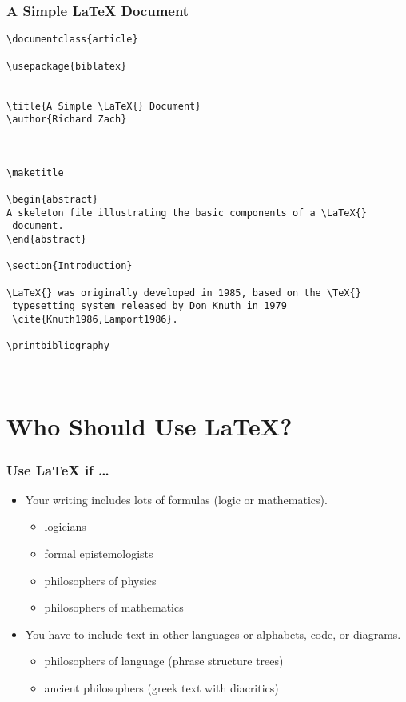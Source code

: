 \begin{frame}[fragile]
\frametitle{A Simple \LaTeX{} Document}

\begin{verbatim}
\documentclass{article}

\usepackage{biblatex}


\title{A Simple \LaTeX{} Document}
\author{Richard Zach}



\maketitle

\begin{abstract}
A skeleton file illustrating the basic components of a \LaTeX{}
 document.
\end{abstract}

\section{Introduction}

\LaTeX{} was originally developed in 1985, based on the \TeX{}
 typesetting system released by Don Knuth in 1979
 \cite{Knuth1986,Lamport1986}.

\printbibliography



\end{verbatim}
\end{frame}


\section*{Who Should Use \LaTeX{}?}

\begin{frame}
\frametitle{Use \LaTeX{} if \dots }

\begin{itemize}
\item Your writing includes lots of formulas (logic or mathematics). 
  \begin{itemize}
  \item logicians 
  \item formal epistemologists
  \item philosophers of physics
  \item philosophers of mathematics
  \end{itemize}

\item You have to include text in other languages or alphabets, code,
or diagrams.
\begin{itemize}
\item philosophers of language (phrase structure trees)
\item ancient philosophers (greek text with diacritics)
\end{itemize}

\end{itemize}

\end{frame}

